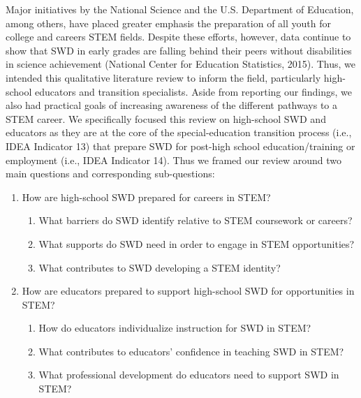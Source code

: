 \documentclass[11pt]{sig-alternate}
\begin{document}
\begin{large}
Major initiatives by the National Science and the U.S. Department of Education, among others, have placed greater emphasis the preparation of all youth for college and careers STEM fields. Despite these efforts, however, data continue to show that SWD in early grades are falling behind their peers without disabilities in science achievement (National Center for Education Statistics, 2015). Thus, we intended this qualitative literature review to inform the field, particularly high-school educators and transition specialists. Aside from reporting our findings, we also had practical goals of increasing awareness of the different pathways to a STEM career. We specifically focused this review on high-school SWD and educators as they are at the core of the special-education transition process (i.e., IDEA Indicator 13) that prepare SWD for post-high school education/training or employment (i.e., IDEA Indicator 14). Thus we framed our review around two main questions and corresponding sub-questions:  
\begin{enumerate}
    \item How are high-school SWD prepared for careers in STEM? 
    \begin{enumerate}
        \item What barriers do SWD identify relative to STEM coursework or careers?
        \item What supports do SWD need in order to engage in STEM opportunities?
        \item What contributes to SWD developing a STEM identity?
    \end{enumerate}
    \item How are educators prepared to support high-school SWD for opportunities in STEM?
    \begin{enumerate}
        \item How do educators individualize instruction for SWD in STEM?
        \item What contributes to educators’ confidence in teaching SWD in STEM?
        \item What professional development do educators need to support SWD in STEM?

    \end{enumerate}
\end{enumerate}


\end{large}
\end{document}
